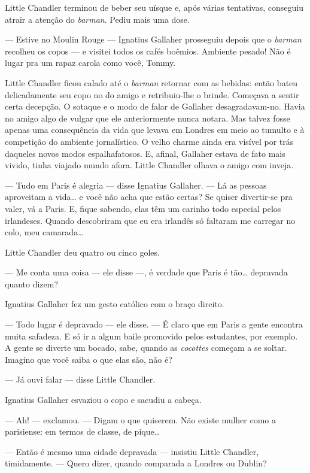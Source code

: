 Little Chandler terminou de beber seu uísque e, após várias tentativas,
conseguiu atrair a atenção do \textit{barman}.  Pediu mais uma dose.

--- Estive no Moulin Rouge --- Ignatius Gallaher prosseguiu depois que o
\textit{barman} recolheu os copos --- e visitei todos os cafés boêmios.
Ambiente pesado!  Não é lugar pra um rapaz carola como você, Tommy.

Little Chandler ficou calado até o \textit{barman} retornar com as bebidas:
então bateu delicadamente seu copo no do amigo e retribuiu-lhe o brinde.
Começava a sentir certa decepção.  O sotaque e o modo de falar de Gallaher
desagradavam-no.  Havia no amigo algo de vulgar que ele anteriormente nunca
notara.  Mas talvez fosse apenas uma consequência da vida que levava em Londres
em meio ao tumulto e à competição do ambiente jornalístico.  O velho charme
ainda era visível por trás daqueles novos modos espalhafatosos.  E, afinal,
Gallaher estava de fato mais vivido, tinha viajado mundo afora.  Little
Chandler olhava o amigo com inveja.

--- Tudo em Paris é alegria --- disse Ignatius Gallaher.  --- Lá as pessoas
aproveitam a vida\ldots{} e você não acha que estão certas?  Se quiser
divertir-se pra valer, vá a Paris.  E, fique sabendo, elas têm um carinho todo
especial pelos irlandeses.  Quando descobriram que eu era irlandês só faltaram
me carregar no colo, meu camarada\ldots{}

Little Chandler deu quatro ou cinco goles.

--- Me conta uma coisa --- ele disse ---, é verdade que Paris é tão\ldots{}
depravada quanto dizem?

Ignatius Gallaher fez um gesto católico com o braço direito.

--- Todo lugar é depravado --- ele disse.  --- É claro que em Paris a gente
encontra muita safadeza.  E só ir a algum baile promovido pelos estudantes, por
exemplo.  A gente se diverte um bocado, sabe, quando as \textit{cocottes}
começam a se soltar.  Imagino que você saiba o que elas são, não é?

--- Já ouvi falar --- disse Little Chandler.

Ignatius Gallaher esvaziou o copo e sacudiu a cabeça.

--- Ah! --- exclamou.  --- Digam o que quiserem.  Não existe mulher como a
parisiense: em termos de classe, de pique\ldots{}

--- Então é mesmo uma cidade depravada --- insistiu Little Chandler,
timidamente.  --- Quero dizer, quando comparada a Londres ou Dublin?

